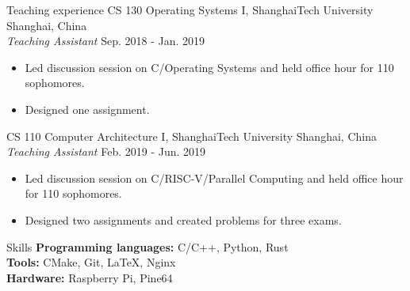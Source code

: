\documentclass{resume} %
\begin{document}
\begin{rSection}{Teaching experience}
CS 130 Operating Systems I, ShanghaiTech University \hfill {Shanghai, China}\\
\textit{Teaching Assistant} \hfill {Sep. 2018 - Jan. 2019}
\begin{itemize}
    \item Led discussion session on C/Operating Systems and held office hour for 110 sophomores.
    \item Designed one assignment.
\end{itemize}

CS 110 Computer Architecture I, ShanghaiTech University \hfill {Shanghai, China}\\
\textit{Teaching Assistant} \hfill {Feb. 2019 - Jun. 2019}
\begin{itemize}
    \item Led discussion session on C/RISC-V/Parallel Computing and held office hour for 110 sophomores.
    \item Designed two assignments and created problems for three exams.
\end{itemize}
\end{rSection}

\begin{rSection}{Skills}
{\bf Programming languages:} C/C++, Python, Rust\\
{\bf Tools:} CMake, Git, \LaTeX, Nginx\\
{\bf Hardware:} Raspberry Pi, Pine64
\end{rSection}
\end{document}
